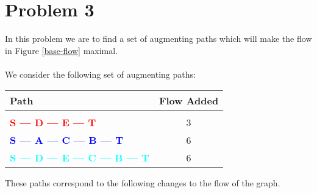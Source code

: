 \section*{Problem 3}

In this problem we are to find a set of augmenting paths which will 
make the flow in Figure \ref{base-flow} maximal. 
\\
\\
We consider the following set of augmenting paths:
\begin{center}
    \begin{tabular}{ l | c }
    \textbf{Path} & \textbf{Flow Added} \\
    \hline\\
    \textcolor{red}{\textbf{S --- D --- E --- T}} & 3 \\
    \textcolor{blue}{\textbf{S --- A --- C --- B --- T}} & 6 \\
    \textcolor{cyan}{\textbf{S --- D --- E --- C --- B --- T}} & 6 \\
    \end{tabular}
\end{center}

These paths correspond to the following changes to the flow of the
graph.

